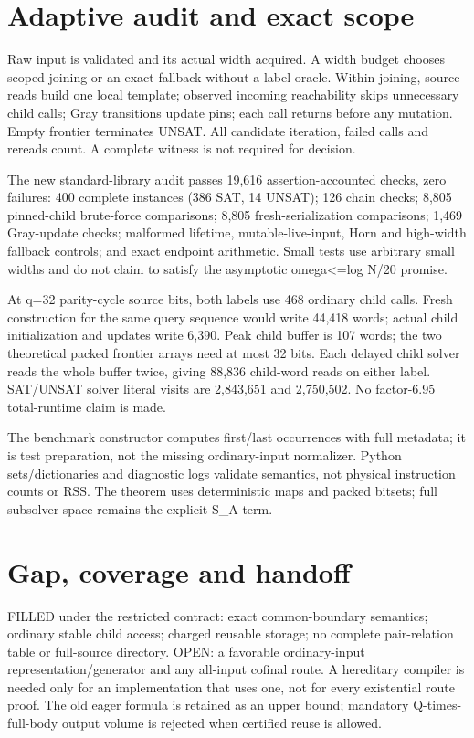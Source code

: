 \documentclass[11pt]{article}
\begin{document}
\section{Adaptive audit and exact scope}
Raw input is validated and its actual width acquired. A width budget chooses scoped joining or an exact fallback without a label oracle. Within joining, source reads build one local template; observed incoming reachability skips unnecessary child calls; Gray transitions update pins; each call returns before any mutation. Empty frontier terminates UNSAT. All candidate iteration, failed calls and rereads count. A complete witness is not required for decision.

The new standard-library audit passes 19,616 assertion-accounted checks, zero failures: 400 complete instances (386 SAT, 14 UNSAT); 126 chain checks; 8,805 pinned-child brute-force comparisons; 8,805 fresh-serialization comparisons; 1,469 Gray-update checks; malformed lifetime, mutable-live-input, Horn and high-width fallback controls; and exact endpoint arithmetic. Small tests use arbitrary small widths and do not claim to satisfy the asymptotic omega<=log N/20 promise.

At q=32 parity-cycle source bits, both labels use 468 ordinary child calls. Fresh construction for the same query sequence would write 44,418 words; actual child initialization and updates write 6,390. Peak child buffer is 107 words; the two theoretical packed frontier arrays need at most 32 bits. Each delayed child solver reads the whole buffer twice, giving 88,836 child-word reads on either label. SAT/UNSAT solver literal visits are 2,843,651 and 2,750,502. No factor-6.95 total-runtime claim is made.

The benchmark constructor computes first/last occurrences with full metadata; it is test preparation, not the missing ordinary-input normalizer. Python sets/dictionaries and diagnostic logs validate semantics, not physical instruction counts or RSS. The theorem uses deterministic maps and packed bitsets; full subsolver space remains the explicit S_A term.

\section{Gap, coverage and handoff}
FILLED under the restricted contract: exact common-boundary semantics; ordinary stable child access; charged reusable storage; no complete pair-relation table or full-source directory. OPEN: a favorable ordinary-input representation/generator and any all-input cofinal route. A hereditary compiler is needed only for an implementation that uses one, not for every existential route proof. The old eager formula is retained as an upper bound; mandatory Q-times-full-body output volume is rejected when certified reuse is allowed.
\end{document}

